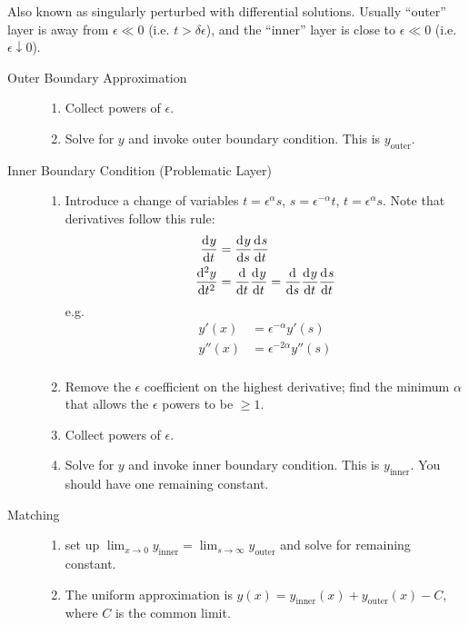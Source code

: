 \item[Boundary Layers] Also known as singularly perturbed with differential
  solutions. Usually ``outer'' layer is away from $\epsilon\ll0$ (i.e.
  $t>\delta\epsilon$), and the ``inner'' layer is close to $\epsilon\ll0$ (i.e.
  $\epsilon\downarrow0$).
  \begin{description}
  \item [Outer Boundary Approximation] \hfill
    \begin{enumerate}
    \item Collect powers of $\epsilon$.
    \item Solve for $y$ and invoke outer boundary condition. This is
      $y_{\text{outer}}$.
    \end{enumerate}
  \item[Inner Boundary Condition (Problematic Layer)] \hfill
    \begin{enumerate}
    \item Introduce a change of variables $t=\epsilon^{\alpha}s$,
      $s=\epsilon^{-\alpha}t$, $t=\epsilon^{\alpha}s$. Note that derivatives
      follow this rule:
      \begin{align*}
        \od{y}{t} &= \od{y}{s}\od{s}{t} \\
        \od[2]{y}{t} &= \od{}{t}\od{y}{t} = \od{}{s}\od{y}{t}\od{s}{t}
      \end{align*}
      e.g.
      \begin{align*}
        y'(x) &= \epsilon^{-\alpha}y'(s) \\
        y''(x) &= \epsilon^{-2\alpha}y''(s) \\
      \end{align*}
    \item Remove the $\epsilon$ coefficient on the highest derivative; find the
      minimum $\alpha$ that allows the $\epsilon$ powers to be $\ge1$.
    \item Collect powers of $\epsilon$.
    \item Solve for $y$ and invoke inner boundary condition. This is
      $y_{\text{inner}}$. You should have one remaining constant.
    \end{enumerate}
  \item[Matching] \hfill
    \begin{enumerate}
    \item set up
      $\lim_{x\rightarrow0}y_{\text{inner}}=\lim_{s\rightarrow\infty}y_{\text{outer}}$
      and solve for remaining constant.
    \item The uniform approximation is $y(x)=y_{\text{inner}}(x) +
      y_{\text{outer}}(x)-C$, where $C$ is the common limit.
    \end{enumerate}


\end{description}
